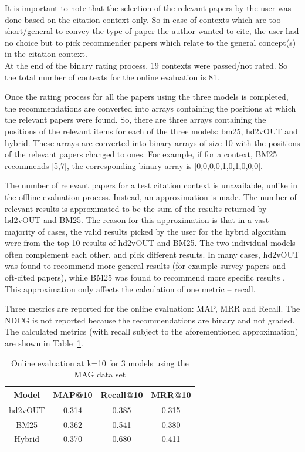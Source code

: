 It is important to note that the selection of the relevant papers by the user was done based on the citation context only. So in case of contexts which are too short/general to convey the type of paper the author wanted to cite, the user had no choice but to pick recommender papers which relate to the general concept(s) in the citation context. \\
At the end of the binary rating process, 19 contexts were passed/not rated. So the total number of contexts for the online evaluation is 81.

Once the rating process for all the papers using the three models is completed, the recommendations are converted into arrays containing the positions at which the relevant papers were found. So, there are three arrays containing the positions of the relevant items for each of the three models: bm25, hd2vOUT and hybrid. These arrays are converted into binary arrays of size 10 with the positions of the relevant papers changed to ones. For example, if for a context, BM25 recommends [5,7], the corresponding binary array is [0,0,0,0,1,0,1,0,0,0].

The number of relevant papers for a test citation context is unavailable, unlike in the offline evaluation process. Instead, an approximation is made. The number of relevant results is approximated to be the sum of the results returned by hd2vOUT and BM25. The reason for this approximation is that in a vast majority of cases, the valid results picked by the user for the hybrid algorithm were from the top 10 results of hd2vOUT and BM25. The two individual models often complement each other, and pick different results. In many cases, hd2vOUT was found to recommend more general results (for example survey papers and oft-cited papers), while BM25 was found to recommend more specific results . This approximation only affects the calculation of one metric -- recall.

Three metrics are reported for the online evaluation: MAP, MRR and Recall. The NDCG is not reported because the recommendations are binary and not graded.
The calculated metrics (with recall subject to the aforementioned approximation) are shown in Table~\ref{tab:onlineevalresults}. 

\begin{table}[]
    \centering
    \begin{tabular}{cccc}
        \toprule
         Model & MAP@10 & Recall@10 & MRR@10  \\
         \midrule
         hd2vOUT & 0.314 & 0.385 & 0.315 \\
         BM25 & 0.362 & 0.541 & 0.380  \\
         Hybrid & 0.370 & 0.680 & 0.411  \\
         \bottomrule
    \end{tabular}
    \caption{Online evaluation at k=10 for 3 models using the MAG data set}
    \label{tab:onlineevalresults}
\end{table}

